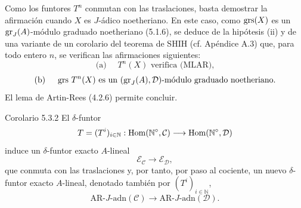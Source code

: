 \begin{prooftext}[Demostración]
Como los funtores \(T^n\) conmutan con las traslaciones, basta demostrar la afirmación cuando \(X\) es \(J\)-ádico noetheriano. En este caso, como \(\operatorname{grs}(X)\) es un \(\operatorname{gr}_J(A)\)-módulo graduado noetheriano (5.1.6), se deduce de la hipótesis (ii) y de una variante de un corolario del teorema de SHIH (cf. Apéndice A.3) que, para todo entero \(n\), se verifican las afirmaciones siguientes:
\[
\text{(a) }\quad T^n(X)\text{ verifica (MLAR),}
\]
\[
\text{(b) }\quad \operatorname{grs}\,T^n(X)\text{ es un }(\operatorname{gr}_J(A),\mathcal D)\text{-módulo graduado noetheriano.}
\]
El lema de Artin-Rees (4.2.6) permite concluir.
\end{prooftext}

\begin{statement}{Corolario 5.3.2}
El \(\delta\)-funtor
\[
T=(T^i)_{i\in\mathbb N}:\operatorname{Hom}(\mathbb N^\circ,\mathcal C)\longrightarrow\operatorname{Hom}(\mathbb N^\circ,\mathcal D)
\]
induce un \(\delta\)-funtor exacto \(A\)-lineal
\[
\mathcal E_{\mathcal C}\longrightarrow\mathcal E_{\mathcal D},
\]
que conmuta con las traslaciones y, por tanto, por paso al cociente, un nuevo \(\delta\)-funtor exacto \(A\)-lineal, denotado también por \((T^i)_{i\in\mathbb N}\),
\[
\mathrm{AR}\text{-}J\text{-adn}(\mathcal C)\longrightarrow
\mathrm{AR}\text{-}J\text{-adn}(\mathcal D).
\]
\end{statement}
